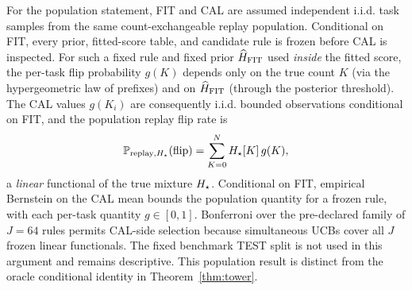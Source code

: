 For the population statement, FIT and CAL are assumed independent i.i.d.
task samples from the same count-exchangeable replay population. Conditional
on FIT, every prior, fitted-score table, and candidate rule is frozen before
CAL is inspected. For such a fixed rule and fixed prior $\widehat H_{\rm FIT}$
used \emph{inside} the fitted score, the per-task flip probability $g(K)$
depends only on the true count $K$ (via the hypergeometric law of prefixes)
and on $\widehat H_{\rm FIT}$ (through the posterior threshold). The CAL
values $g(K_i)$ are consequently i.i.d. bounded observations conditional on
FIT, and the population replay flip rate is
\[
\mathbb{P}_{\text{replay},H_\star}(\mathrm{flip})=\sum_{K=0}^{N} H_\star[K]\,g(K),
\]
a \emph{linear} functional of the true mixture $H_\star$. Conditional on FIT,
empirical Bernstein on the CAL mean bounds the population quantity for a
frozen rule, with each per-task quantity $g\in[0,1]$. Bonferroni over the
pre-declared family of $J=64$ rules permits CAL-side selection because
simultaneous UCBs cover all $J$ frozen linear functionals. The fixed benchmark
TEST split is not used in this argument and remains descriptive. This
population result is distinct from the oracle conditional identity in
Theorem~\ref{thm:tower}.
